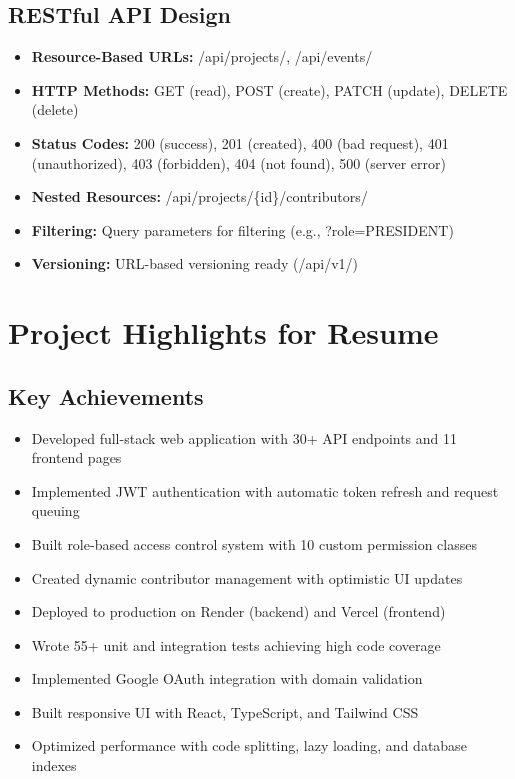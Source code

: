 \documentclass[11pt,a4paper]{article}
\begin{document}
\subsection{RESTful API Design}
\begin{itemize}[leftmargin=*]
    \item \textbf{Resource-Based URLs:} /api/projects/, /api/events/
    \item \textbf{HTTP Methods:} GET (read), POST (create), PATCH (update), DELETE (delete)
    \item \textbf{Status Codes:} 200 (success), 201 (created), 400 (bad request), 401 (unauthorized), 403 (forbidden), 404 (not found), 500 (server error)
    \item \textbf{Nested Resources:} /api/projects/\{id\}/contributors/
    \item \textbf{Filtering:} Query parameters for filtering (e.g., ?role=PRESIDENT)
    \item \textbf{Versioning:} URL-based versioning ready (/api/v1/)
\end{itemize}

\section{Project Highlights for Resume}

\subsection{Key Achievements}
\begin{itemize}[leftmargin=*]
    \item Developed full-stack web application with 30+ API endpoints and 11 frontend pages
    \item Implemented JWT authentication with automatic token refresh and request queuing
    \item Built role-based access control system with 10 custom permission classes
    \item Created dynamic contributor management with optimistic UI updates
    \item Deployed to production on Render (backend) and Vercel (frontend)
    \item Wrote 55+ unit and integration tests achieving high code coverage
    \item Implemented Google OAuth integration with domain validation
    \item Built responsive UI with React, TypeScript, and Tailwind CSS
    \item Optimized performance with code splitting, lazy loading, and database indexes
\end{itemize}
\end{document}
